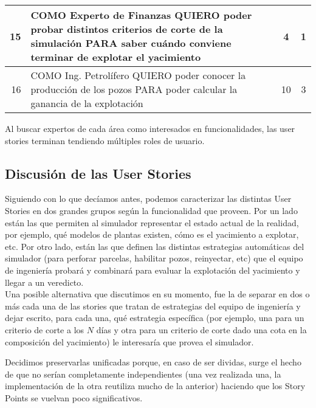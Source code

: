 \begin{center}
\begin{tabular}{| r | p{13cm} | c | c | }
    15 & COMO Experto de Finanzas QUIERO poder probar distintos criterios de corte de la simulación PARA saber cuándo conviene terminar de explotar el yacimiento & 4 & 1\\ \hline

    16 & COMO Ing. Petrolífero QUIERO poder conocer la producción de los pozos PARA poder calcular la ganancia de la explotación & 10 & 3\\ \hline
    
  \end{tabular}
\end{center}

Al buscar expertos de cada área como interesados en funcionalidades, las user stories terminan tendiendo múltiples roles de usuario.

\subsection{Discusión de las User Stories}

Siguiendo con lo que decíamos antes, podemos caracterizar las 
distintas User Stories en dos grandes grupos según la funcionalidad que proveen.  
Por un lado están las que permiten al simulador representar el estado actual de la realidad, 
por ejemplo, qué modelos de plantas existen, cómo es el yacimiento a explotar, etc.
Por otro lado, están las que definen las distintas estrategias automáticas del 
simulador (para perforar parcelas, habilitar pozos, reinyectar, etc) que el equipo 
de ingeniería probará y combinará para evaluar la explotación 
del yacimiento y llegar a un veredicto. \\

Una posible alternativa que discutimos en su momento, fue la de separar en dos o más cada una de las stories que tratan de estrategias del equipo de ingeniería y dejar escrito, para cada una, qué estrategia específica (por ejemplo, una para un criterio de corte a los $N$ días y otra para un criterio de corte dado una cota en la composición del yacimiento) le interesaría que provea el simulador.

Decidimos preservarlas unificadas porque, en caso de ser dividas, surge el hecho de que no serían completamente independientes (una vez realizada una, la implementación de la otra reutiliza mucho de la anterior) haciendo que los Story Points se vuelvan poco significativos.
\\

